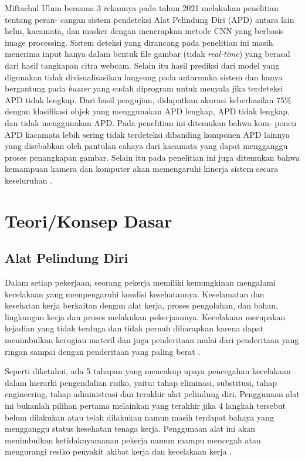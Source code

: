 Miftachul Ulum bersama 3 rekannya pada tahun 2021 melakukan penelitian tentang peran-
cangan sistem pendeteksi Alat Pelindung Diri (APD) antara lain helm, kacamata, dan masker
dengan menerapkan metode CNN yang berbasis image processing. Sistem deteksi yang dirancang pada penelitian ini masih menerima input hanya dalam bentuk file gambar (tidak \emph{real-time}) yang berasal dari hasil tangkapan citra webcam. Selain itu hasil prediksi dari model yang digunakan tidak divisualisasikan langsung pada antarmuka sistem dan hanya bergantung pada \emph{buzzer} yang sudah diprogram untuk menyala jika terdeteksi APD tidak lengkap.
Dari hasil pengujian, didapatkan akurasi keberhasilan 75\% dengan klasifikasi objek yang menggunakan APD lengkap,
APD tidak lengkap, dan tidak menggunakan APD. Pada penelitian ini ditemukan bahwa kom-
ponen APD kacamata lebih sering tidak terdeteksi dibanding komponen APD lainnya yang
disebabkan oleh pantulan cahaya dari kacamata yang dapat mengganggu proses penangkapan gambar. Selain itu pada penelitian ini juga ditemukan bahwa kemampuan kamera dan komputer
akan memengaruhi kinerja sistem secara keseluruhan \cite{miftachul_2021}.

\section{Teori/Konsep Dasar}

\subsection{Alat Pelindung Diri}
\label{apd}

Dalam setiap pekerjaan, seorang pekerja memiliki kemungkinan mengalami kecelakaan yang mempengaruhi kondisi kesehatannya. Keselamatan dan kesehatan kerja berkaitan dengan alat kerja, proses pengolahan, dan bahan, lingkungan kerja dan proses melakukan pekerjaannya. Kecelakaan merupakan kejadian yang tidak terduga dan tidak pernah diharapkan karena dapat menimbulkan kerugian materil dan juga penderitaan mulai dari penderitaan yang ringan sampai dengan penderitaan yang paling berat \cite{anizar2012}.

Seperti diketahui, ada 5 tahapan yang mencakup upaya pencegahan kecelakaan dalam hierarki pengendalian risiko, yaitu: tahap eliminasi, substitusi, tahap engineering, tahap administrasi dan terakhir alat pelindung diri. Penggunaan alat ini bukanlah pilihan pertama melainkan yang terakhir jika 4 langkah tersebut belum dilakukan atau telah dilakukan namun masih terdapat bahaya yang mengganggu status kesehatan tenaga kerja. Penggunaan alat ini akan menimbulkan ketidaknyamanan pekerja namun mampu mencegah atau mengurangi resiko penyakit akibat kerja dan kecelakaan kerja \cite{k3ptglobal}.

